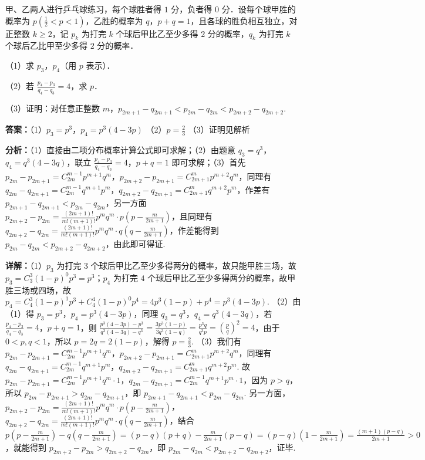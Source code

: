\begin{question}[points=17]
甲、乙两人进行乒乓球练习，每个球胜者得 $1$ 分，负者得 $0$ 分．设每个球甲胜的概率为 $p\left(\frac{1}{2}<p<1\right)$，乙胜的概率为 $q$，$p+q=1$，且各球的胜负相互独立，对正整数 $k\ge 2$，记 $p_k$ 为打完 $k$ 个球后甲比乙至少多得 $2$ 分的概率，$q_k$ 为打完 $k$ 个球后乙比甲至少多得 $2$ 分的概率．

（1）求 $p_3$，$p_4$（用 $p$ 表示）．

（2）若 $\frac{p_4-p_3}{q_4-q_3}=4$，求 $p$．

（3）证明：对任意正整数 $m$，$p_{2m+1}-q_{2m+1}<p_{2m}-q_{2m}<p_{2m+2}-q_{2m+2}$.
\begin{solution}
\textbf{答案：}（1）$p_3=p^3$，$p_4=p^3(4-3p)$
（2）$p=\frac{2}{3}$
（3）证明见解析

\textbf{分析：}（1）直接由二项分布概率计算公式即可求解；（2）由题意 $q_3=q^3$，$q_4=q^3(4-3q)$，联立 $\frac{p_4-p_3}{q_4-q_3}=4$，$p+q=1$ 即可求解；（3）首先 $p_{2m}-p_{2m+1}=C_{2m}^{m-1}p^{m+1}q^m$，$p_{2m+2}-p_{2m+1}=C_{2m+1}^{m}p^{m+2}q^m$，同理有 $q_{2m}-q_{2m+1}=C_{2m}^{m-1}q^{m+1}p^m$，$q_{2m+2}-q_{2m+1}=C_{2m+1}^{m}q^{m+2}p^m$，作差有 $p_{2m+1}-q_{2m+1}<p_{2m}-q_{2m}$，另一方面 $p_{2m+2}-p_{2m}=\frac{(2m+1)!}{m!(m+1)!}p^mq^m\cdot p\left(p-\frac{m}{2m+1}\right)$，且同理有 $q_{2m+2}-q_{2m}=\frac{(2m+1)!}{m!(m+1)!}p^mq^m\cdot q\left(q-\frac{m}{2m+1}\right)$，作差能得到 $p_{2m}-q_{2m}<p_{2m+2}-q_{2m+2}$，由此即可得证.

\textbf{详解：}（1）$p_3$ 为打完 $3$ 个球后甲比乙至少多得两分的概率，故只能甲胜三场，故 $p_3=C_3^3(1-p)^0p^3=p^3$；$p_4$ 为打完 $4$ 个球后甲比乙至少多得两分的概率，故甲胜三场或四场，故 $p_4=C_4^3(1-p)^1p^3+C_4^4(1-p)^0p^4=4p^3(1-p)+p^4=p^3(4-3p)$.
（2）由（1）得 $p_3=p^3$，$p_4=p^3(4-3p)$，同理 $q_3=q^3$，$q_4=q^3(4-3q)$，若 $\frac{p_4-p_3}{q_4-q_3}=4$，$p+q=1$，则 $\frac{p^3(4-3p)-p^3}{q^3(4-3q)-q^3}=\frac{3p^3(1-p)}{3q^3(1-q)}=\frac{p^3q}{q^3p}=\left(\frac{p}{q}\right)^2=4$，由于 $0<p,q<1$，所以 $p=2q=2(1-p)$，解得 $p=\frac{2}{3}$.
（3）我们有 $p_{2m}-p_{2m+1}=C_{2m}^{m-1}p^{m+1}q^m$，$p_{2m+2}-p_{2m+1}=C_{2m+1}^{m}p^{m+2}q^m$，同理有 $q_{2m}-q_{2m+1}=C_{2m}^{m-1}q^{m+1}p^m$，$q_{2m+2}-q_{2m+1}=C_{2m+1}^{m}q^{m+2}p^m$. 故 $p_{2m}-p_{2m+1}=C_{2m}^{m-1}p^{m+1}q^m\cdot 1$，$q_{2m}-q_{2m+1}=C_{2m}^{m-1}q^{m+1}p^m\cdot 1$，因为 $p>q$，所以 $p_{2m}-p_{2m+1}>q_{2m}-q_{2m+1}$，即 $p_{2m+1}-q_{2m+1}<p_{2m}-q_{2m}$. 另一方面，$p_{2m+2}-p_{2m}=\frac{(2m+1)!}{m!(m+1)!}p^mq^m\cdot p\left(p-\frac{m}{2m+1}\right)$，$q_{2m+2}-q_{2m}=\frac{(2m+1)!}{m!(m+1)!}p^mq^m\cdot q\left(q-\frac{m}{2m+1}\right)$，结合 $p\left(p-\frac{m}{2m+1}\right)-q\left(q-\frac{m}{2m+1}\right)=(p-q)(p+q)-\frac{m}{2m+1}(p-q)=(p-q)\left(1-\frac{m}{2m+1}\right)=\frac{(m+1)(p-q)}{2m+1}>0$，就能得到 $p_{2m+2}-p_{2m}>q_{2m+2}-q_{2m}$，即 $p_{2m}-q_{2m}<p_{2m+2}-q_{2m+2}$，证毕.
\end{solution}
\end{question}

